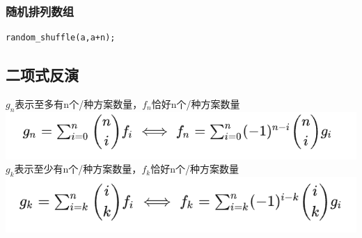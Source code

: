 \documentclass[12pt, a4paper, oneside]{ctexart}
\begin{document}
\subsubsection{随机排列数组} 
\begin{lstlisting}
random_shuffle(a,a+n);
\end{lstlisting}

\newpage 
\subsection{二项式反演} 
$g_n$表示至多有n个/种方案数量，$f_n$恰好n个/种方案数量\\
\centering
\includegraphics[scale=0.7]{a2.png}
$g_k$表示至少有n个/种方案数量，$f_k$恰好n个/种方案数量\\
\centering
\includegraphics[scale=0.7]{a1.png}
\begin{lstlisting}
\end{lstlisting}

\newpage 
\end{document}
